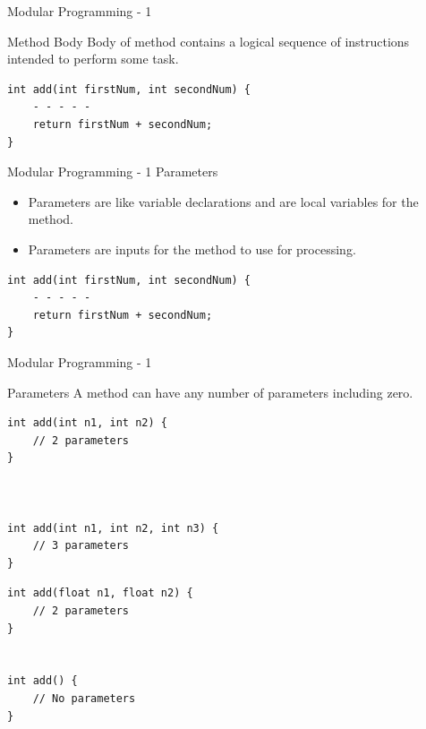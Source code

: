\documentclass[14pt]{beamer}
\begin{document}
\begin{frame}[fragile]{Modular Programming - 1}
 \begin{block}{Method Body}
  Body of method contains a logical sequence of instructions intended to perform some task.
 \end{block}
 \begin{block}{}
  \begin{lstlisting}[numbers=none]
int add(int firstNum, int secondNum) {
    - - - - - 
    return firstNum + secondNum;
}
\end{lstlisting}

 \end{block}
\end{frame}

\begin{frame}[fragile]{Modular Programming - 1}
 Parameters
 \begin{itemize}
  \item Parameters are like variable declarations and are local variables for the method.
  \item Parameters are inputs for the method to use for processing.
 \end{itemize}
 
 \vspace{1pc}
 \begin{minipage}{3cm}
 \small
  \hspace{1cm}\color{red}{100, 200}\newline
  \color{black}{add(100, 200);}
 \end{minipage}
 \quad
 \begin{minipage}{7cm}
  \begin{lstlisting}[numbers=none, frame=single]
int add(int firstNum, int secondNum) {
    - - - - - 
    return firstNum + secondNum;
}
\end{lstlisting}

 \end{minipage}
\end{frame}

\begin{frame}[fragile]{Modular Programming - 1}
 \begin{block}{Parameters}
  A method can have any number of parameters including zero.
 \end{block}
 \begin{minipage}{5.5cm}
  \begin{lstlisting}[numbers=none]
int add(int n1, int n2) {
    // 2 parameters
}



int add(int n1, int n2, int n3) {
    // 3 parameters
}
  \end{lstlisting}
 \end{minipage}
 \quad
\begin{minipage}{4.6cm}
 \begin{lstlisting}[numbers=none]
int add(float n1, float n2) {
    // 2 parameters
}


int add() {
    // No parameters
}
 \end{lstlisting}
\end{minipage}

\end{frame}
\end{document}
